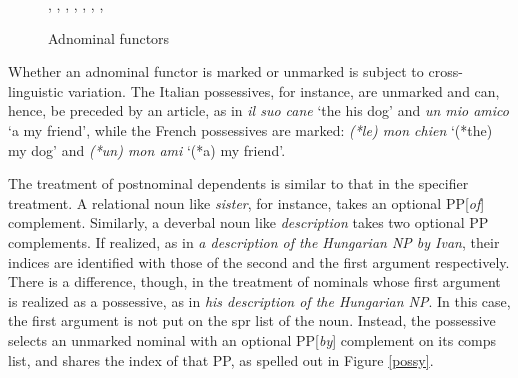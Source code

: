 \documentclass[output=paper]{langsci/langscibook}
\begin{document}
\begin{figure}
\begin{center}
\footnotesize
\tree
{,
  {,
    {}},
  {,
    {,
      {}},  
    {,
      {}}}}
\caption{\label{markyy} Adnominal functors }
\normalsize
\end{center}
\end{figure}

Whether an adnominal functor is marked or unmarked is subject to cross-linguistic variation. 
The Italian possessives, for instance, are unmarked and can, hence, be preceded 
by an article, as in {\it il suo cane\/} `the his dog' and {\it un mio amico\/} `a my friend', 
while the French possessives are marked: {\it (*le) mon chien\/} `(*the) my dog' 
and {\it (*un) mon ami\/} `(*a) my friend'. 

The treatment of postnominal dependents is similar to that in the specifier treatment. 
A relational noun like {\it sister}, for instance, takes an optional PP[{\it of\/}] complement.  
Similarly, a deverbal noun like {\it description\/} takes two optional PP complements. 
If realized, as in {\it a description of the Hungarian NP by Ivan}, 
their indices are identified with those of the second and the first argument respectively. 
There is a difference, though, in the treatment of nominals 
whose first argument is realized as a possessive, as in 
{\it his description of the Hungarian NP}. In this case, the first argument is not put on the 
{\sc spr} list of the noun. Instead, the possessive selects an unmarked nominal with an optional 
PP[{\it by\/}] complement on its {\sc comps} list, and shares the index of that PP, 
as spelled out in Figure \ref{possy}. 
\end{document}
